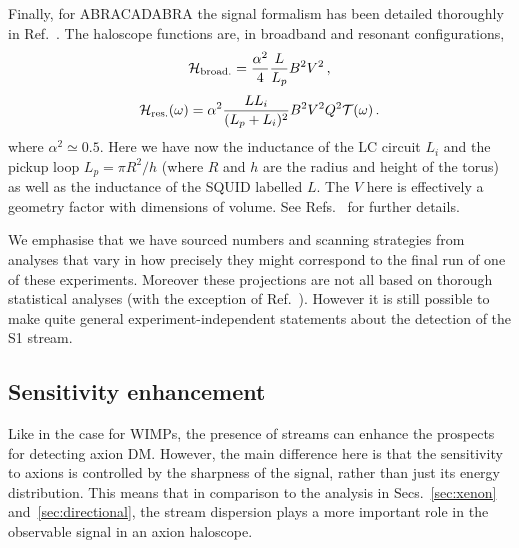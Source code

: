 \documentclass[prd,10pt,twocolumn,showpacs,nofootinbib,aps,superscriptaddress,preprintnumbers]{revtex4-1}
\begin{document}
Finally, for ABRACADABRA the signal formalism has been detailed thoroughly in Ref.~\cite{Foster:2017hbq}. 
The haloscope functions are, in broadband and resonant configurations,
\begin{equation}
\mathcal{H}_{\rm broad.} = \frac{\alpha^2}{4} \frac{L}{L_p} B^2 V^2 \, ,
\end{equation}
\begin{equation}
\mathcal{H}_{\rm res.}(\omega) = \alpha^2 \frac{L L_i}{(L_p+L_i)^2} B^2 V^2 Q^2 \mathcal{T}(\omega) \, .
\end{equation}
where $\alpha^2 \simeq 0.5$. Here we have now the inductance of the LC circuit $L_i$ and the pickup loop $L_p = \pi R^2/h$ (where $R$ and $h$ are the radius and height of the torus) as well as the inductance of the SQUID labelled $L$. The $V$ here is effectively a geometry factor with dimensions of volume. See Refs.~\cite{Foster:2017hbq, Kahn:2016aff} for further details. 

We emphasise that we have sourced numbers and scanning strategies from analyses that vary in how precisely they might correspond to the final run of one of these experiments. Moreover these projections are not all based on thorough statistical analyses (with the exception of Ref.~\cite{Foster:2017hbq}). However it is still possible to make quite general experiment-independent statements about the detection of the S1 stream.

\subsection{Sensitivity enhancement}


Like in the case for WIMPs, the presence of streams can enhance the prospects for detecting axion DM.
 However, the main difference here is that the sensitivity to axions is controlled by the sharpness of the signal, 
 rather than just its energy distribution. 
 This means that in comparison to the analysis in Secs.~\ref{sec:xenon} and~\ref{sec:directional}, the stream dispersion plays
 a more important role in the observable signal in an axion haloscope.
\end{document}
